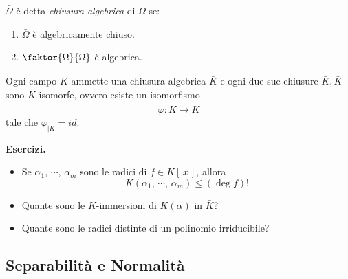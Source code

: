 \begin{multicols}{2}
\begin{definition}
	$ \bar{\Omega} $ è detta \emph{chiusura algebrica} di $ \Omega $ se:
	\begin{enumerate}
		\item $ \bar{\Omega} $ è algebricamente chiuso.
		\item $ \faktor{\bar{\Omega}}{\Omega} $ è algebrica.
	\end{enumerate}
\end{definition}

\begin{theorem}
	Ogni campo $ K $ ammette una chiusura algebrica $ \bar{K} $ e ogni due sue chiusure $ \bar{K}, \bar{\bar{K}} $ sono $ K $ isomorfe, ovvero esiste un isomorfismo
	\[ \varphi : \bar{K} \to \bar{\bar{K}} \]
	tale che $ \varphi_{|K} = id $.
\end{theorem}

\textbf{Esercizi.}
\begin{itemize}
	\item Se $ \alpha_1,\, \cdots,\, \alpha_m $ sono le radici di $ f \in K[\,x\,] $, allora
	 \[ K(\alpha_1,\, \cdots,\, \alpha_m) \leq (\deg f)! \]
	 
	 \item Quante sono le $ K $-immersioni di $ K(\alpha) $ in $ \bar{K} $?
	 
	 \item Quante sono le radici distinte di un polinomio irriducibile?
\end{itemize}


\end{multicols}


\subsection{Separabilità e Normalità}


